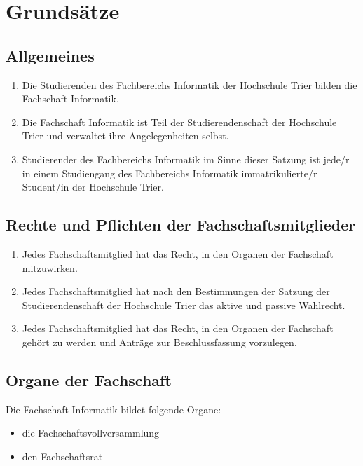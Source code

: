 \section{Grundsätze}

\subsection{Allgemeines}
\begin{enumerate}
\item Die Studierenden des Fachbereichs Informatik der Hochschule Trier bilden die Fachschaft Informatik.
\item Die Fachschaft Informatik ist Teil der Studierendenschaft der Hochschule Trier und verwaltet ihre Angelegenheiten selbst.
\item Studierender des Fachbereichs Informatik im Sinne dieser Satzung ist jede/r in einem Studiengang des Fachbereichs Informatik immatrikulierte/r Student/in der Hochschule Trier.
\end{enumerate}

\subsection{Rechte und Pflichten der Fachschaftsmitglieder}
\begin{enumerate}
\item Jedes Fachschaftsmitglied hat das Recht, in den Organen der Fachschaft mitzuwirken.
\item Jedes Fachschaftsmitglied hat nach den Bestimmungen der Satzung der Studierendenschaft der Hochschule Trier das aktive und passive Wahlrecht.
\item Jedes Fachschaftsmitglied hat das Recht, in den Organen der Fachschaft gehört zu werden und Anträge zur Beschlussfassung vorzulegen.
\end{enumerate}

\subsection{Organe der Fachschaft}
Die Fachschaft Informatik bildet folgende Organe:
\begin{itemize}
\item die Fachschaftsvollversammlung
\item den Fachschaftsrat
\end{itemize}

